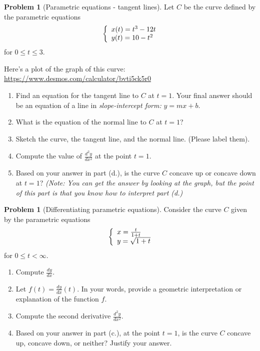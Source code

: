 \documentclass[10pt]{article}
\theoremstyle{definition}
\newtheorem{problem}[theorem]{Problem}
\newcommand{\1}[1]{\textbf{1}_{\left[#1\right]}} %
\begin{document}
\begin{problem}[Parametric equations - tangent lines]
  Let $C$ be the curve defined by the parametric equations
  \begin{equation}
    \left\{ \begin{array}{l@{}l} x(t) = t^{3}-12t \\
        y(t) = 10-t^{2} \end{array}\right.
  \end{equation}
  for $0 \leq t \leq 3$.

  
  Here's a plot of the graph of this curve: \url{https://www.desmos.com/calculator/bvti5ck5r0}
  
  \begin{enumerate}[(a.)]
    \item Find an equation for the tangent line to $C$ at $t=1$. Your final answer
    should be an equation of a line in \textit{slope-intercept form:} $y=mx+b$.
    \item What is the equation of the normal line to $C$ at $t=1$?
    \item Sketch the curve, the tangent line, and the normal line. (Please
    label them).
    \item Compute the value of $\frac{d^{2}y}{dx^{2}}$ at the point $t=1$.
    \item Based on your answer in part (d.), is the curve $C$ concave up or
    concave down at $t=1$? \textit{(Note: You can get the answer by looking at
      the graph, but the point of this part is that you know how to interpret
      part (d.)}
    \vspace{3em}
  \end{enumerate}
 
  
  \begin{problem}[Differentiating parametric equations]
    Consider the curve $C$ given by the parametric equations
    \begin{equation*}
      \left\{ \begin{array}{l@{}l} x=\frac{t}{1+t} \\ y = \sqrt{1+t} \end{array}\right.
    \end{equation*}
    for $0 \leq t <\infty$.
    \begin{enumerate}[(a.)]
      \item Compute $\frac{dy}{dx}.$
      \item Let $f(t)=\frac{dy}{dx}(t)$. In your words, provide a geometric interpretation or explanation
      of the function $f$.
      \item Compute the second derivative $\frac{d^{2}y}{dx^{2}}$.
      \item Based on your answer in part (c.), at the point $t=1$, is the curve $C$ concave up, concave down, or
      neither? Justify your answer.
    \end{enumerate}
  \end{problem}

\end{problem}



\end{document}
